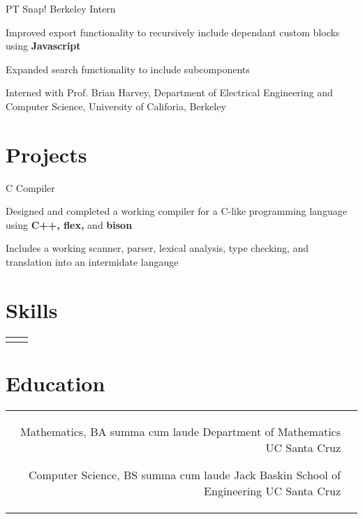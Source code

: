 \documentclass[10pt]{article}
\begin{document}
\begin{paracol}{2}
{PT}
{Snap!}
{Berkeley}
{Intern}
{}
{
\item Improved export functionality to recursively include dependant custom
  blocks using \textbf{Javascript}
\item Expanded search functionality to include subcomponents
\item Interned with Prof. Brian Harvey, Department of Electrical Engineering
  and Computer Science, University of Califoria, Berkeley
}

\vspace{-\baselineskip}\medskip

\switchcolumn

\section{Projects}

{}{}{}
{C Compiler}{}
{
  \item Designed and completed a working compiler for a C-like programming language
    using \textbf{C++, flex,} and \textbf{bison}
  \item Includes a working scanner, parser, lexical analysis, type checking,
    and translation in\-to an intermidate langauge
}

\section{Skills}
\begin{supertabular}{rl}


\end{supertabular}

\section{Education}

\begin{supertabular}{rl}
	{Mathematics, BA}
	{summa cum laude}
    {Department of Mathematics}
	{UC Santa Cruz}

    {Computer Science, BS}
    {summa cum laude}
    {Jack Baskin School of Engineering}
    {UC Santa Cruz}

\end{supertabular}

\end{paracol}
\end{document}
